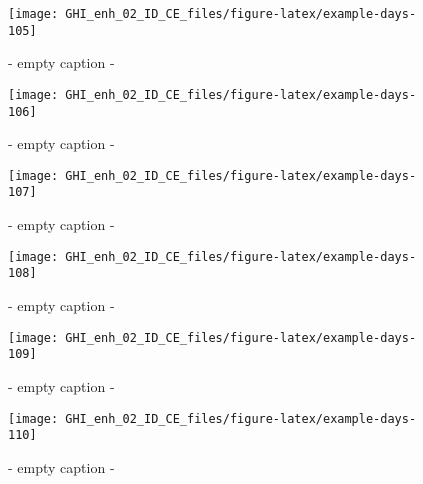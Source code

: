 \documentclass[
  10pt,
  a4paper,oneside]{article}
\begin{document}
\begin{figure}[H]

{\centering \texttt{[image: GHI\_enh\_02\_ID\_CE\_files/figure-latex/example-days-105]} 

}

\caption{ - empty caption - }\label{fig:example-days-105}
\end{figure}

\begin{figure}[H]

{\centering \texttt{[image: GHI\_enh\_02\_ID\_CE\_files/figure-latex/example-days-106]} 

}

\caption{ - empty caption - }\label{fig:example-days-106}
\end{figure}

\begin{figure}[H]

{\centering \texttt{[image: GHI\_enh\_02\_ID\_CE\_files/figure-latex/example-days-107]} 

}

\caption{ - empty caption - }\label{fig:example-days-107}
\end{figure}

\begin{figure}[H]

{\centering \texttt{[image: GHI\_enh\_02\_ID\_CE\_files/figure-latex/example-days-108]} 

}

\caption{ - empty caption - }\label{fig:example-days-108}
\end{figure}

\begin{figure}[H]

{\centering \texttt{[image: GHI\_enh\_02\_ID\_CE\_files/figure-latex/example-days-109]} 

}

\caption{ - empty caption - }\label{fig:example-days-109}
\end{figure}

\begin{figure}[H]

{\centering \texttt{[image: GHI\_enh\_02\_ID\_CE\_files/figure-latex/example-days-110]} 

}

\caption{ - empty caption - }\label{fig:example-days-110}
\end{figure}
\end{document}
